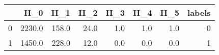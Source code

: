 \begin{tabular}{lrrrrrrr}
\toprule
{} &     H\_0 &    H\_1 &   H\_2 &  H\_3 &  H\_4 &  H\_5 &  labels \\
\midrule
0 &  2230.0 &  158.0 &  24.0 &  1.0 &  1.0 &  1.0 &       0 \\
1 &  1450.0 &  228.0 &  12.0 &  0.0 &  0.0 &  0.0 &       1 \\
\bottomrule
\end{tabular}
